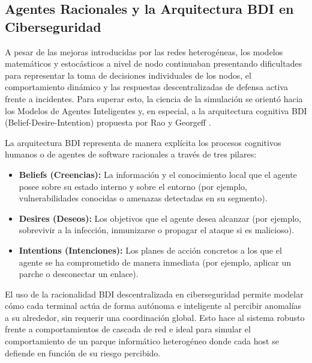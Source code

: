 \subsection{Agentes Racionales y la Arquitectura BDI en Ciberseguridad}
A pesar de las mejoras introducidas por las redes heterogéneas, los modelos matemáticos y estocásticos a nivel de nodo continuaban presentando dificultades para representar la toma de decisiones individuales de los nodos, el comportamiento dinámico y las respuestas descentralizadas de defensa activa frente a incidentes. Para superar esto, la ciencia de la simulación se orientó hacia los Modelos de Agentes Inteligentes y, en especial, a la arquitectura cognitiva BDI (Belief-Desire-Intention) propuesta por Rao y Georgeff \cite{rao1995bdi}.

La arquitectura BDI representa de manera explícita los procesos cognitivos humanos o de agentes de software racionales a través de tres pilares:
\begin{itemize}
    \item \textbf{Beliefs (Creencias):} La información y el conocimiento local que el agente posee sobre su estado interno y sobre el entorno (por ejemplo, vulnerabilidades conocidas o amenazas detectadas en su segmento).
    \item \textbf{Desires (Deseos):} Los objetivos que el agente desea alcanzar (por ejemplo, sobrevivir a la infección, inmunizarse o propagar el ataque si es malicioso).
    \item \textbf{Intentions (Intenciones):} Los planes de acción concretos a los que el agente se ha comprometido de manera inmediata (por ejemplo, aplicar un parche o desconectar un enlace).
\end{itemize}

El uso de la racionalidad BDI descentralizada en ciberseguridad permite modelar cómo cada terminal actúa de forma autónoma e inteligente al percibir anomalías a su alrededor, sin requerir una coordinación global. Esto hace al sistema robusto frente a comportamientos de cascada de red e ideal para simular el comportamiento de un parque informático heterogéneo donde cada host se defiende en función de su riesgo percibido.

